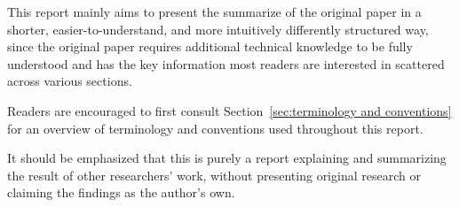 \documentclass[twocolumn]{report}
\begin{document}
This report mainly aims to present the \alert{summarize} of the original paper in a \alert{shorter}, \alert{easier-to-understand}, and \alert{more intuitively differently structured way}, since the original paper requires additional technical knowledge to be fully understood and has the key information most readers are interested in scattered across various sections.

Readers are encouraged to first consult Section~\ref{sec:terminology and conventions} for an \alert{overview of terminology and conventions} used throughout this report.

\alert{It should be emphasized that this is purely a report explaining and summarizing the result of other researchers' work, without presenting original research or claiming the findings as the author's own.}
\end{document}
